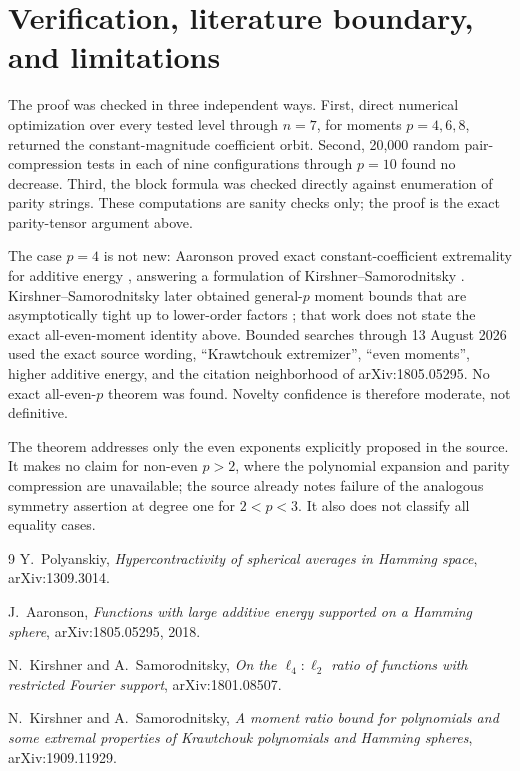 \documentclass[11pt]{article}
\begin{document}
\section{Verification, literature boundary, and limitations}

The proof was checked in three independent ways.  First, direct numerical
optimization over every tested level through $n=7$, for moments
$p=4,6,8$, returned the constant-magnitude coefficient orbit.  Second,
20,000 random pair-compression tests in each of nine configurations through
$p=10$ found no decrease.  Third, the block formula was checked directly
against enumeration of parity strings.  These computations are sanity
checks only; the proof is the exact parity-tensor argument above.

The case $p=4$ is not new: Aaronson proved exact constant-coefficient
extremality for additive energy \cite{Aaronson}, answering a formulation of
Kirshner--Samorodnitsky \cite{KS18}.  Kirshner--Samorodnitsky later obtained
general-$p$ moment bounds that are asymptotically tight up to lower-order
factors \cite{KS19}; that work does not state the exact all-even-moment
identity above.  Bounded searches through 13 August 2026 used the exact
source wording, ``Krawtchouk extremizer'', ``even moments'', higher additive
energy, and the citation neighborhood of arXiv:1805.05295.  No exact
all-even-$p$ theorem was found.  Novelty confidence is therefore moderate,
not definitive.

The theorem addresses only the even exponents explicitly proposed in the
source.  It makes no claim for non-even $p>2$, where the polynomial
expansion and parity compression are unavailable; the source already notes
failure of the analogous symmetry assertion at degree one for
$2<p<3$.  It also does not classify all equality cases.

\begin{thebibliography}{9}
Y.~Polyanskiy,
\emph{Hypercontractivity of spherical averages in Hamming space},
arXiv:1309.3014.

J.~Aaronson,
\emph{Functions with large additive energy supported on a Hamming sphere},
arXiv:1805.05295, 2018.

N.~Kirshner and A.~Samorodnitsky,
\emph{On the $\ell_4:\ell_2$ ratio of functions with restricted Fourier
support}, arXiv:1801.08507.

N.~Kirshner and A.~Samorodnitsky,
\emph{A moment ratio bound for polynomials and some extremal properties of
Krawtchouk polynomials and Hamming spheres}, arXiv:1909.11929.
\end{thebibliography}
\end{document}
